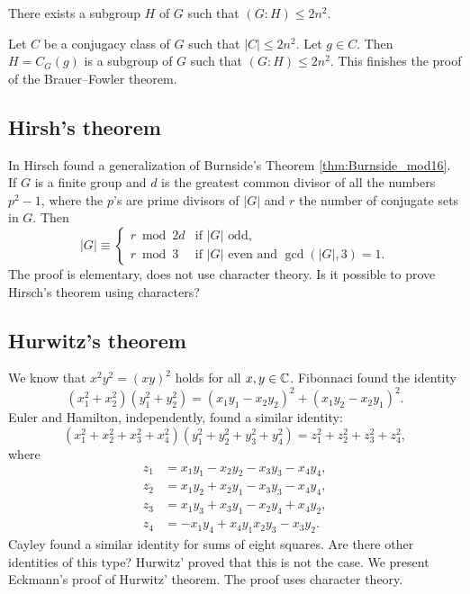 \begin{claim}
    There exists a subgroup $H$ of $G$ such that
    $(G:H)\leq 2n^2$.
\end{claim}

Let $C$ be a conjugacy class of $G$ such that 
$|C|\leq 2n^2$. Let $g\in C$.  
Then $H=C_G(g)$ is a subgroup of $G$ such that
$(G:H)\leq 2n^2$. 
This finishes the proof of the Brauer--Fowler theorem. 


\subsection*{Hirsh's theorem}

In \cite{MR36755} Hirsch found a generalization of Burnside's Theorem \ref{thm:Burnside_mod16}.  
If $G$ is a finite group and $d$ is the greatest common divisor of all 
the numbers $p^2-1$, where the $p$'s are prime divisors of $|G|$ and $r$ the number of conjugate sets in $G$. Then 
\[
|G|\equiv\begin{cases} 
    r\bmod 2d &\text{if $|G|$ odd,}\\
    r\bmod 3 & \text{if $|G|$ even and $\gcd(|G|,3)=1$.}
    \end{cases}
\]
The proof is elementary, does not use character theory. Is it possible
to prove Hirsch's theorem using characters?

\subsection*{Hurwitz's theorem}
\label{Hurwitz}

We know that $x^2y^2=(xy)^2$ holds for all $x,y\in\mathbb{C}$. Fibonnaci
found the identity
\[
	(x_1^2+x_2^2)(y_1^2+y_2^2)=(x_1y_1-x_2y_2)^2+(x_1y_2-x_2y_1)^2.
\]
Euler and Hamilton, independently, found 
a similar identity:
\[
	(x_1^2+x_2^2+x_3^2+x_4^2)(y_1^2+y_2^2+y_3^2+y_4^2)=z_1^2+z_2^2+z_3^2+z_4^2,
\]
where
\begin{equation}
\label{eq:Hamilton}
\begin{aligned}
	 z_1&=x_1y_1-x_2y_2-x_3y_3-x_4y_4,\\
	 z_2&=x_1y_2+x_2y_1-x_3y_3-x_4y_4,\\
	 z_3&=x_1y_3+x_3y_1-x_2y_4+x_4y_2,\\ 
	 z_4&=-x_1y_4+x_4y_1x_2y_3-x_3y_2.
\end{aligned}
\end{equation}
Cayley found a similar identity for sums of eight squares. 
Are there other identities of this type? Hurwitz' proved that this is not the case. 
We present Eckmann's proof of Hurwitz' theorem. The proof uses character theory.

